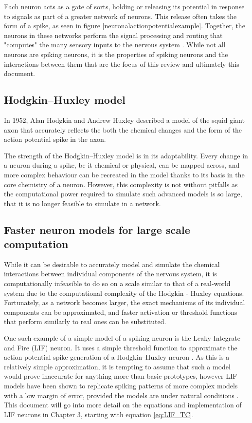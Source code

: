 Each neuron acts as a gate of sorts, holding or releasing its potential in
response to signals as part of a greater network of neurons. This release often
takes the form of a spike, as seen in figure \ref{neuronalactionpotentialexample}.
Together, the neurons in these networks perform the signal processing and
routing that "computes" the many sensory inputs to the nervous system
\autocite{koch_biophysics_2004}. While not all neurons are spiking neurons, it
is the properties of spiking neurons and the interactions between them that are
the focus of this review and ultimately this document.

\subsection{Hodgkin–Huxley model}

In 1952, Alan Hodgkin and Andrew Huxley described a model of the squid giant
axon that accurately reflects the both the chemical changes and the form of the
action potential spike in the axon. \autocite{hodgkin_quantitative_1952}

The strength of the Hodgkin–Huxley model is in its adaptability. Every change in
a neuron during a spike, be it chemical or physical, can be mapped across, and
more complex behaviour can be recreated in the model thanks to its basis in the
core chemistry of a neuron. However, this complexity is not without pitfalls as
the computational power required to simulate such advanced models is so large,  that it is no longer feasible to simulate in a network.

\subsection{Faster neuron models for large scale computation}

While it can be desirable to accurately model and simulate the chemical
interactions between individual components of the nervous system, it is
computationally infeasible to do so on a scale similar to that of a real-world
system due to the computational complexity of the Hodgkin - Huxley equations.
Fortunately, as a network becomes larger, the exact mechanisms of its individual
components can be approximated, and faster activation or threshold functions
that perform similarly to real ones can be substituted.

One such example of a simple model of a spiking neuron is the Leaky Integrate
and Fire (LIF) neuron. It uses a simple threshold function to approximate the
action potential spike generation of a Hodgkin–Huxley neuron
\autocite{trappenberg_fundamentals_2009}. As this is a relatively simple
approximation, it is tempting to assume that such a model would prove inaccurate
for anything more than basic prototypes, however LIF models have been shown to
replicate spiking patterns of more complex models with a low margin of error,
provided the models are under natural conditions
\autocite{teeter_generalized_2018}. This document will go into more detail on
the equations and implementation of LIF neurons in Chapter 3, starting with
equation \eqref{eq:LIF_TC}.